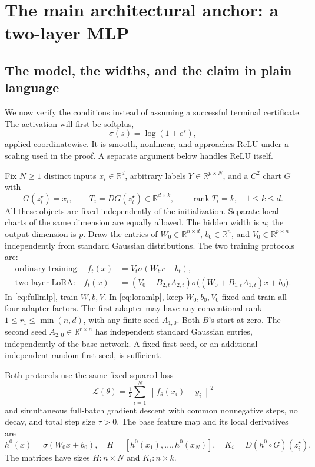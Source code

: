 \documentclass[12pt,a4paper]{article}
\theoremstyle{readable}
\theoremstyle{definition}\newtheorem{example}[theorem]{Example}
\newcommand{\R}{\mathbb R}\newcommand{\rank}{\operatorname{rank}}
\newcommand{\norm}[1]{\left\|#1\right\|}
\begin{document}
\section{The main architectural anchor: a two-layer MLP}
\label{sec:mlp}

\subsection{The model, the widths, and the claim in plain language}
We now verify the conditions instead of assuming a successful terminal certificate. The activation will first be softplus,
\[
\sigma(s)=\log(1+e^s),
\]
applied coordinatewise. It is smooth, nonlinear, and approaches ReLU under a scaling used in the proof. A separate argument below handles ReLU itself.

Fix \(N\ge1\) distinct inputs \(x_i\in\R^d\), arbitrary labels \(Y\in\R^{p\times N}\), and a \(C^2\) chart \(G\) with
\[
G(z_i^\star)=x_i,\qquad T_i=DG(z_i^\star)\in\R^{d\times k},
\qquad \rank T_i=k,\quad 1\le k\le d.
\]
All these objects are fixed independently of the initialization. Separate local charts of the same dimension are equally allowed. The hidden width is \(n\); the output dimension is \(p\). Draw the entries of \(W_0\in\R^{n\times d}\), \(b_0\in\R^n\), and \(V_0\in\R^{p\times n}\) independently from standard Gaussian distributions. The two training protocols are:
\begin{align}
\text{ordinary training:}\quad
f_t(x)&=V_t\sigma(W_tx+b_t),\label{eq:fullmlp}\\
\text{two-layer LoRA:}\quad
f_t(x)&=(V_0+B_{2,t}A_{2,t})
\sigma\bigl((W_0+B_{1,t}A_{1,t})x+b_0\bigr).
\label{eq:loramlp}
\end{align}
In \eqref{eq:fullmlp}, train \(W,b,V\). In \eqref{eq:loramlp}, keep \(W_0,b_0,V_0\) fixed and train all four adapter factors. The first adapter may have any conventional rank \(1\le r_1\le\min(n,d)\), with any finite seed \(A_{1,0}\). Both \(B\)'s start at zero. The second seed \(A_{2,0}\in\R^{r\times n}\) has independent standard Gaussian entries, independently of the base network. A fixed first seed, or an additional independent random first seed, is sufficient.

Both protocols use the same fixed squared loss
\[
\mathcal L(\theta)=\tfrac12\sum_{i=1}^N\norm{f_\theta(x_i)-y_i}^2
\]
and simultaneous full-batch gradient descent with common nonnegative steps, no decay, and total step size \(\tau>0\). The base feature map and its local derivatives are
\[
h^0(x)=\sigma(W_0x+b_0),\quad
H=[h^0(x_1),\ldots,h^0(x_N)],\quad
K_i=D(h^0\circ G)(z_i^\star).
\]
The matrices have sizes \(H:n\times N\) and \(K_i:n\times k\).
\end{document}

